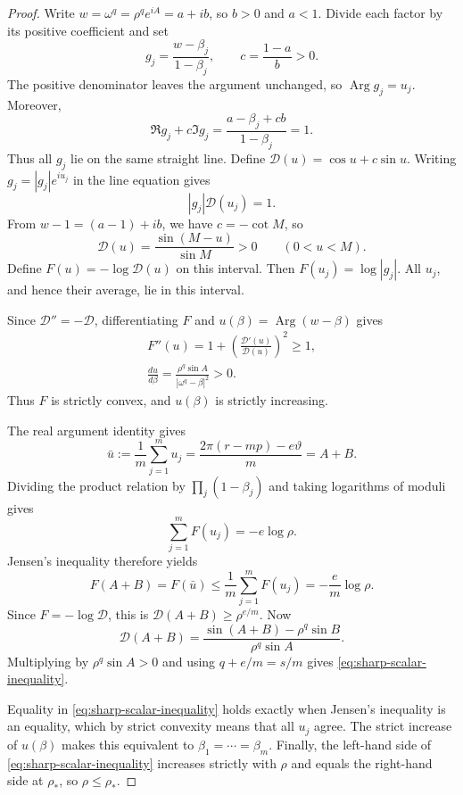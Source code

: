 \documentclass[11pt,a4paper]{article}
\theoremstyle{definition}
\theoremstyle{remark}
\numberwithin{equation}{section}
\begin{document}
\begin{proof}
Write $w=\omega^q=\rho^qe^{iA}=a+ib$, so $b>0$ and $a<1$. Divide each factor by its positive coefficient and set
\[
 g_j=\frac{w-\beta_j}{1-\beta_j},\qquad c=\frac{1-a}{b}>0.
\]
The positive denominator leaves the argument unchanged, so $\operatorname{Arg}g_j=u_j$. Moreover,
\[
 \Re g_j+c\Im g_j
 =\frac{a-\beta_j+cb}{1-\beta_j}=1.
\]
Thus all $g_j$ lie on the same straight line. Define $\mathcal D(u)=\cos u+c\sin u$. Writing $g_j=|g_j|e^{iu_j}$ in the line equation gives
\[
 |g_j|\mathcal D(u_j)=1.
\]
From $w-1=(a-1)+ib$, we have $c=-\cot M$, so
\[
 \mathcal D(u)=\frac{\sin(M-u)}{\sin M}>0\qquad(0<u<M).
\]
Define $F(u)=-\log\mathcal D(u)$ on this interval. Then $F(u_j)=\log|g_j|$. All $u_j$, and hence their average, lie in this interval.

Since $\mathcal D''=-\mathcal D$, differentiating $F$ and $u(\beta)=\operatorname{Arg}(w-\beta)$ gives
\begin{equation}\label{eq:one-factor-convexity}
 \begin{gathered}
 F''(u)=1+\left(\frac{\mathcal D'(u)}{\mathcal D(u)}\right)^2\ge1,\\
 \frac{du}{d\beta}=\frac{\rho^q\sin A}{|\omega^q-\beta|^2}>0.
 \end{gathered}
\end{equation}
Thus $F$ is strictly convex, and $u(\beta)$ is strictly increasing.

The real argument identity gives
\[
 \bar u:=\frac1m\sum_{j=1}^m u_j
 =\frac{2\pi(r-mp)-e\vartheta}{m}=A+B.
\]
Dividing the product relation by $\prod_j(1-\beta_j)$ and taking logarithms of moduli gives
\[
 \sum_{j=1}^m F(u_j)=-e\log\rho.
\]
Jensen's inequality therefore yields
\[
 F(A+B)=F(\bar u)\le\frac1m\sum_{j=1}^mF(u_j)
 =-\frac em\log\rho.
\]
Since $F=-\log\mathcal D$, this is $\mathcal D(A+B)\ge\rho^{e/m}$. Now
\[
 \mathcal D(A+B)
 =\frac{\sin(A+B)-\rho^q\sin B}{\rho^q\sin A}.
\]
Multiplying by $\rho^q\sin A>0$ and using $q+e/m=s/m$ gives \eqref{eq:sharp-scalar-inequality}.

Equality in \eqref{eq:sharp-scalar-inequality} holds exactly when Jensen's inequality is an equality, which by strict convexity means that all $u_j$ agree. The strict increase of $u(\beta)$ makes this equivalent to $\beta_1=\cdots=\beta_m$. Finally, the left-hand side of \eqref{eq:sharp-scalar-inequality} increases strictly with $\rho$ and equals the right-hand side at $\rho_*$, so $\rho\le\rho_*$.
\end{proof}
\end{document}

